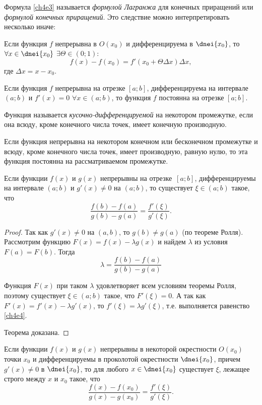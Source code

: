 Формула \eqref{ch4e3} называется \textit{формулой Лагранжа} для конечных приращений или \textit{формулой конечных приращений}.
Это следствие можно интерпретировать несколько иначе:

\begin{cons}
Если функция $f$ непрерывна в $O(x_0)$ и дифференцируема в $\dnei{x_0}$, то $\forall x \in \dnei{x_0}$ $\exists \Theta \in (0;1)$:
$$
f(x) - f(x_0) = f'(x_0 + \Theta\Delta x)\Delta x,
$$
где $\Delta x=x-x_0$.
\end{cons}

\begin{cons}
Если функция $f$ непрерывна на отрезке $[a; b]$, дифференцируема на интервале $(a;b)$ и $f'(x) = 0$ $\forall x \in (a;b)$, то функция $f$ постоянна на отрезке $[a; b]$.	
\end{cons}

\begin{defn}Функция называется \textit{кусочно-дифференцируемой} на некотором промежутке, если она всюду, кроме конечного числа точек, имеет конечную производную.
\end{defn}

\begin{cons} Если функция непрерывна на некотором конечном или бесконечном промежутке и всюду, кроме конечного числа точек, имеет производную, равную нулю, то эта функция постоянна на рассматриваемом промежутке.
\end{cons}

\begin{thm}  Если функции $f(x)$ и $g(x)$ непрерывны на отрезке~$[a; b]$, дифференцируемы на интервале $(a; b)$ и $g'(x) \ne 0$ на $(a; b)$, то существует $\xi \in (a; b)$ такое, что
\begin{equation}
\label{ch4e4}
\frac{f(b)-f(a)}{g(b)-g(a)}=\frac{f'(\xi)}{g'(\xi)}.
\end{equation}
\end{thm}

\begin{proof} Так как $g'(x) \ne 0$ на $(a,b)$, то $g(b)\ne g(a)$ (по теореме Ролля). Рассмотрим функцию $F(x) =f(x) - \lambda g(x)$ и найдем $\lambda$ из условия $F(a) = F(b)$. Тогда
$$
\lambda = \frac{f(b)-f(a)}{g(b)-g(a)}
$$

Функция $F(x)$ при таком $\lambda$ удовлетворяет всем условиям теоремы Ролля, поэтому существует $\xi \in (a; b)$ такое, что $F'(\xi) = 0$. А так как $F'(x) = f'(x) - \lambda g'(x)$, то $f'(\xi) = \lambda g'(\xi)$, т.е. выполняется равенство \eqref{ch4e4}.

Теорема доказана.
\end{proof}

\begin{cons} \label{ch4.1cons5}
	Если функции $f(x)$ и $g(x)$ непрерывны в некоторой окрестности $O(x_0)$ точки $x_0$ и дифференцируемы в проколотой
окрестности $\dnei{x_0}$, причем $g'(x) \ne 0$ в  $\dnei{x_0}$, то  для любого $x \in  \dnei{x_0}$ существует $\xi$, лежащее строго между $x$ и $x_0$ такое, что
$$
\frac{f(x)-f(x_0)}{g(x)-g(x_0)}=\frac{f'(\xi)}{g'(\xi)}.
$$
\end{cons}